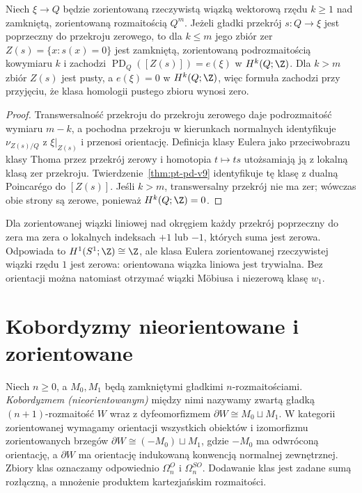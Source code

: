 \begin{wniosek}
\label{cor:euler-zero-v9}
Niech $\xi\to Q$ będzie zorientowaną rzeczywistą wiązką
wektorową rzędu $k\ge1$ nad zamkniętą, zorientowaną
rozmaitością $Q^m$. Jeżeli gładki przekrój
$s:Q\to\xi$ jest poprzeczny do przekroju zerowego,
to dla $k\le m$ jego zbiór zer
$Z(s)=\{x:s(x)=0\}$ jest zamkniętą, zorientowaną
podrozmaitością kowymiaru $k$ i zachodzi
$\operatorname{PD}_Q([Z(s)])=e(\xi)$ w $H^k(Q;\Z)$.
Dla $k>m$ zbiór $Z(s)$ jest pusty, a
$e(\xi)=0$ w $H^k(Q;\Z)$,
więc formuła zachodzi przy przyjęciu, że
klasa homologii pustego zbioru wynosi zero.
\end{wniosek}
\begin{proof}
Transwersalność przekroju do przekroju zerowego
daje podrozmaitość wymiaru $m-k$, a pochodna przekroju
w kierunkach normalnych identyfikuje
$\nu_{Z(s)/Q}$ z $\xi|_{Z(s)}$ i przenosi orientację.
Definicja klasy Eulera jako przeciwobrazu klasy Thoma
przez przekrój zerowy i homotopia $t\mapsto t s$
utożsamiają ją z lokalną klasą zer przekroju.
Twierdzenie~\ref{thm:pt-pd-v9} identyfikuje tę klasę
z dualną Poincarégo do $[Z(s)]$. Jeśli $k>m$,
transwersalny przekrój nie ma zer; wówczas obie strony
są zerowe, ponieważ $H^k(Q;\Z)=0$.
\end{proof}

\begin{przyklad}
Dla zorientowanej wiązki liniowej nad okręgiem
każdy przekrój poprzeczny do zera ma zera o
lokalnych indeksach $+1$ lub $-1$, których suma
jest zerowa. Odpowiada to $H^1(S^1;\Z)\cong\Z$,
ale klasa Eulera zorientowanej rzeczywistej wiązki
rzędu $1$ jest zerowa: orientowana wiązka liniowa
jest trywialna. Bez orientacji można natomiast otrzymać
wiązki Möbiusa i niezerową klasę $w_1$.
\end{przyklad}

\section{Kobordyzmy nieorientowane i zorientowane}
\begin{definicja}
Niech $n\ge0$, a $M_0,M_1$ będą zamkniętymi
gładkimi $n$-rozmaitościami.
\emph{Kobordyzmem (nieorientowanym)}
między nimi nazywamy zwartą gładką
$(n+1)$-rozmaitość $W$ wraz z dyfeomorfizmem
$\partial W\cong M_0\sqcup M_1$.
W kategorii zorientowanej wymagamy orientacji wszystkich
obiektów i izomorfizmu zorientowanych brzegów
$\partial W\cong (-M_0)\sqcup M_1$, gdzie
$-M_0$ ma odwróconą orientację, a $\partial W$ ma
orientację indukowaną konwencją normalnej zewnętrznej.
Zbiory klas oznaczamy odpowiednio
$\Omega_n^O$ i $\Omega_n^{SO}$. Dodawanie klas
jest zadane sumą rozłączną, a mnożenie produktem
kartezjańskim rozmaitości.
\end{definicja}


